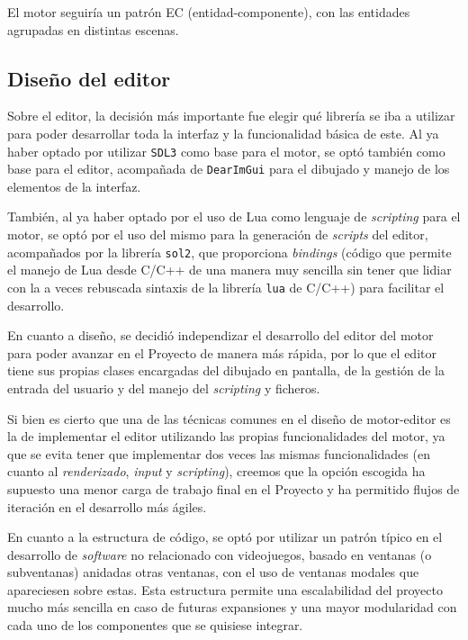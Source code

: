 El motor seguiría un patrón EC (entidad-componente), con las entidades agrupadas en distintas escenas.

\subsection{Diseño del editor}
Sobre el editor, la decisión más importante fue elegir qué librería se iba a utilizar para poder desarrollar toda la interfaz y la funcionalidad básica de este. Al ya haber optado por utilizar \texttt{SDL3} como base para el motor, se optó también como base para el editor, acompañada de \texttt{DearImGui} para el dibujado y manejo de los elementos de la interfaz.

\medskip

También, al ya haber optado por el uso de Lua como lenguaje de \textit{scripting} para el motor, se optó por el uso del mismo para la generación de \textit{scripts} del editor, acompañados por la librería \texttt{sol2}, que proporciona \textit{bindings} (código que permite el manejo de Lua desde C/C++ de una manera muy sencilla sin tener que lidiar con la a veces rebuscada sintaxis de la librería \texttt{lua} de C/C++) para facilitar el desarrollo.

\medskip

En cuanto a diseño, se decidió independizar el desarrollo del editor del motor para poder avanzar en el Proyecto de manera más rápida, por lo que el editor tiene sus propias clases encargadas del dibujado en pantalla, de la gestión de la entrada del usuario y del manejo del \textit{scripting} y ficheros.

\smallskip

Si bien es cierto que una de las técnicas comunes en el diseño de motor-editor es la de implementar el editor utilizando las propias funcionalidades del motor, ya que se evita tener que implementar dos veces las mismas funcionalidades (en cuanto al \textit{renderizado}, \textit{input} y \textit{scripting}), creemos que la opción escogida ha supuesto una menor carga de trabajo final en el Proyecto y ha permitido flujos de iteración en el desarrollo más ágiles.

\medskip

En cuanto a la estructura de código, se optó por utilizar un patrón típico en el desarrollo de \textit{software} no relacionado con videojuegos, basado en ventanas (o subventanas) anidadas otras ventanas, con el uso de ventanas modales que apareciesen sobre estas. Esta estructura permite una escalabilidad del proyecto mucho más sencilla en caso de futuras expansiones y una mayor modularidad con cada uno de los componentes que se quisiese integrar.

